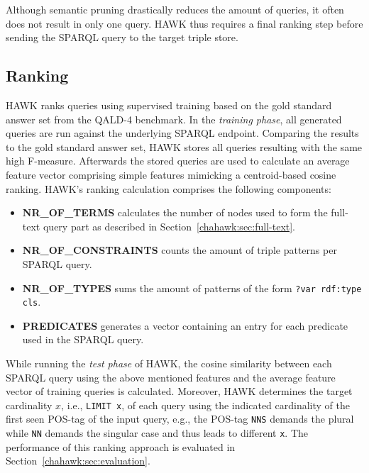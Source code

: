Although semantic pruning drastically reduces the amount of queries, it often does not result in only one query. HAWK thus requires a final ranking step before sending the SPARQL query to the target triple store.

\subsection{Ranking}
HAWK ranks queries using supervised training based on the gold standard answer set from the QALD-4 benchmark.
In the \emph{training phase}, all generated queries are run against the underlying SPARQL endpoint. 
Comparing the results to the gold standard answer set, HAWK stores all queries resulting with the same high F-measure.
Afterwards the stored queries are used to calculate an average feature vector comprising simple features mimicking a centroid-based cosine ranking.
HAWK's ranking calculation comprises the following components:
\begin{itemize}
\item \textbf{NR\_OF\_TERMS} calculates the number of nodes used to form the full-text query part as described in Section~\ref{chahawk:sec:full-text}.
\item \textbf{NR\_OF\_CONSTRAINTS} counts the amount of triple patterns per SPARQL query.
\item \textbf{NR\_OF\_TYPES} sums the amount of patterns of the form \texttt{?var rdf:type cls}.
\item \textbf{PREDICATES} generates a vector containing an entry for each predicate used in the SPARQL query.
\end{itemize}

While running the \emph{test phase} of HAWK, the cosine similarity between each SPARQL query using the above mentioned features and the average feature vector of training queries is calculated.
Moreover, HAWK determines the target cardinality $x$, i.e., \texttt{LIMIT x}, of each query using the indicated cardinality of the first seen POS-tag of the input query, e.g., the POS-tag \texttt{NNS} demands the plural while \texttt{NN} demands the singular case and thus leads to different \texttt{x}.
The performance of this ranking approach is evaluated in Section~\ref{chahawk:sec:evaluation}.

